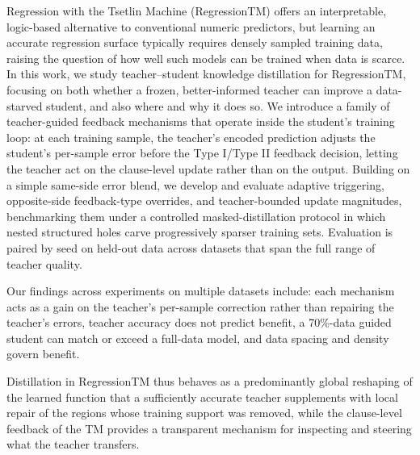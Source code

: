 Regression with the Tsetlin Machine (RegressionTM) offers an interpretable, logic-based alternative to conventional numeric predictors, but learning an accurate regression surface typically requires densely sampled training data, raising the question of how well such models can be trained when data is scarce. In this work, we study teacher–student knowledge distillation for RegressionTM, focusing on both whether a frozen, better-informed teacher can improve a data-starved student, and also where and why it does so. We introduce a family of teacher-guided feedback mechanisms that operate inside the student's training loop: at each training sample, the teacher's encoded prediction adjusts the student's per-sample error before the Type I/Type II feedback decision, letting the teacher act on the clause-level update rather than on the output. Building on a simple same-side error blend, we develop and evaluate adaptive triggering, opposite-side feedback-type overrides, and teacher-bounded update magnitudes, benchmarking them under a controlled masked-distillation protocol in which nested structured holes carve progressively sparser training sets. Evaluation is paired by seed on held-out data across datasets that span the full range of teacher quality. 

Our findings across experiments on multiple datasets include: each mechanism acts as a gain on the teacher's per-sample correction rather than repairing the teacher's errors, teacher accuracy does not predict benefit, a 70\%-data guided student can match or exceed a full-data model, and data spacing and density govern benefit.

Distillation in RegressionTM thus behaves as a predominantly global reshaping of the
learned function that a sufficiently accurate teacher supplements with local repair of the
regions whose training support was removed, while the clause-level feedback of the TM provides a transparent mechanism for inspecting and steering what the teacher transfers.
